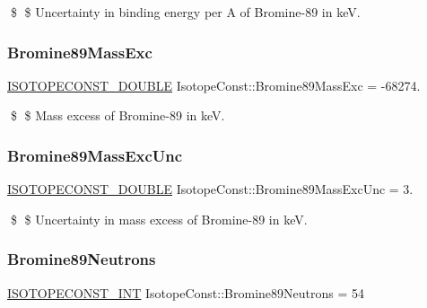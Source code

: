 \$ \$ Uncertainty in binding energy per A of Bromine-\/89 in keV. \mbox{\label{group___isotope_const-_bromine-_br89_ga64df60c6c641cbc8620e15b6594ce31f}} 
\subsubsection{\texorpdfstring{Bromine89\+Mass\+Exc}{Bromine89MassExc}}
{\footnotesize\ttfamily \mbox{\hyperlink{group___isotope_const-_macros_ga8f45a7272ce02c0b4c65c44636ed719a}{I\+S\+O\+T\+O\+P\+E\+C\+O\+N\+S\+T\+\_\+\+D\+O\+U\+B\+LE}} Isotope\+Const\+::\+Bromine89\+Mass\+Exc = -\/68274.}

\$ \$ Mass excess of Bromine-\/89 in keV. \mbox{\label{group___isotope_const-_bromine-_br89_gad46b150922f3f9a89f3e46bf8c8b0f4a}} 
\subsubsection{\texorpdfstring{Bromine89\+Mass\+Exc\+Unc}{Bromine89MassExcUnc}}
{\footnotesize\ttfamily \mbox{\hyperlink{group___isotope_const-_macros_ga8f45a7272ce02c0b4c65c44636ed719a}{I\+S\+O\+T\+O\+P\+E\+C\+O\+N\+S\+T\+\_\+\+D\+O\+U\+B\+LE}} Isotope\+Const\+::\+Bromine89\+Mass\+Exc\+Unc = 3.}

\$ \$ Uncertainty in mass excess of Bromine-\/89 in keV. \mbox{\label{group___isotope_const-_bromine-_br89_gaf6a57d77f6ab88f2ef20d7a7192e8b57}} 
\subsubsection{\texorpdfstring{Bromine89\+Neutrons}{Bromine89Neutrons}}
{\footnotesize\ttfamily \mbox{\hyperlink{group___isotope_const-_macros_ga5f18360b3e99483a35c32d789e62621c}{I\+S\+O\+T\+O\+P\+E\+C\+O\+N\+S\+T\+\_\+\+I\+NT}} Isotope\+Const\+::\+Bromine89\+Neutrons = 54}

